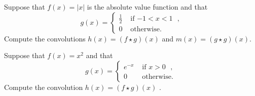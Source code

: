 \documentclass[11pt]{article}
\begin{document}

\begin{exercise}
    Suppose that $f(x) = |x|$ is the absolute value function and that 
    \[
        g(x) = \left\{\begin{array}{cc} \frac 1 2 & \text{ if $-1 < x < 1$ }, \\ 0 & \text{ otherwise. } \end{array}\right.
    \]
    Compute the convolutions $h(x) = (f \star g)(x)$ and $m(x) = (g \star g)(x)$.
\end{exercise}
\begin{solution}     
\end{solution}


\begin{exercise}
    Suppose that $f(x) = x^2$ and that
    \[
        g(x) = \left\{\begin{array}{cc} e^{-x} & \text{ if $x > 0$ }, \\ 0 & \text{ otherwise. } \end{array}\right.
    \]
    Compute the convolution $h(x) = (f \star g)(x)$ .
\end{exercise}

\begin{solution}     
\end{solution}



\begin{exercise}
\end{exercise}
\begin{solution}     
\end{solution}
\end{document}
